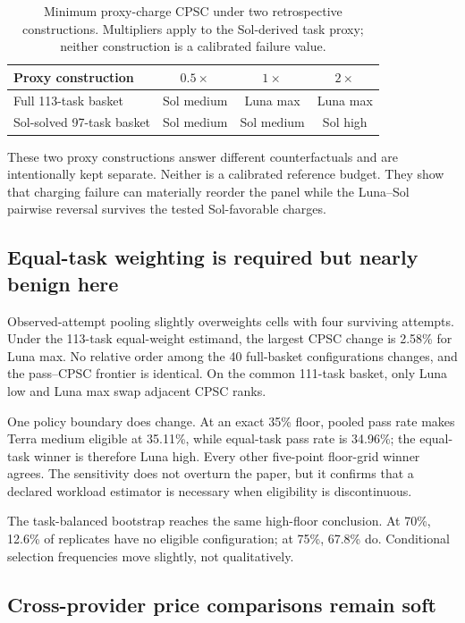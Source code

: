 \documentclass[11pt]{article}
\begin{document}
\begin{table}[H]
\centering
\small
\caption{Minimum proxy-charge CPSC under two retrospective constructions. Multipliers apply to the
Sol-derived task proxy; neither construction is a calibrated failure value.}
\label{tab:failure-policy}
\begin{tabular}{@{}lccc@{}}
\toprule
Proxy construction & $0.5\times$ & $1\times$ & $2\times$ \\
\midrule
Full 113-task basket & Sol medium & Luna max & Luna max \\
Sol-solved 97-task basket & Sol medium & Sol medium & Sol high \\
\bottomrule
\end{tabular}
\end{table}

These two proxy constructions answer different counterfactuals and are intentionally kept
separate. Neither is a calibrated reference budget. They show that charging failure can materially
reorder the panel while the Luna--Sol pairwise reversal survives the tested Sol-favorable charges.

\subsection{Equal-task weighting is required but nearly benign here}

Observed-attempt pooling slightly overweights cells with four surviving attempts. Under the
113-task equal-weight estimand, the largest CPSC change is 2.58\% for Luna max. No relative order
among the 40 full-basket configurations changes, and the pass--CPSC frontier is identical. On the
common 111-task basket, only Luna low and Luna max swap adjacent CPSC ranks.

One policy boundary does change. At an exact 35\% floor, pooled pass rate makes Terra medium
eligible at 35.11\%, while equal-task pass rate is 34.96\%; the equal-task winner is therefore Luna
high. Every other five-point floor-grid winner agrees. The sensitivity does not overturn the paper,
but it confirms that a declared workload estimator is necessary when eligibility is discontinuous.

The task-balanced bootstrap reaches the same high-floor conclusion. At 70\%, 12.6\% of replicates
have no eligible configuration; at 75\%, 67.8\% do. Conditional selection frequencies move
slightly, not qualitatively.

\subsection{Cross-provider price comparisons remain soft}
\end{document}
